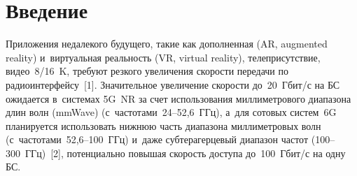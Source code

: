 
  
\vspace*{3pt}



\thispagestyle{headings}

\begin{multicols}{2}

\label{st\stat}
  
\section{Введение}

  Приложения недалекого будущего, такие как дополненная (AR, augmented reality) и~виртуальная 
реальность (VR, virtual reality), телеприсутствие, видео~8/16~K, требуют резкого 
увеличения ско\-рости передачи по радиоинтерфейсу~[1]. Значительное 
увеличение ско\-рости до~20~Гбит/с на БС ожидается 
в~сис\-те\-мах 5G~NR за счет использования мил\-ли\-мет\-ро\-во\-го 
диапазона длин волн (mmWave) (с~час\-то\-та\-ми~24--52,6~ГГц), а~для сотовых 
сис\-тем~6G планируется использовать ниж\-нюю часть диапазона 
мил\-ли\-мет\-ро\-вых волн (с~час\-то\-та\-ми~52,6--100~ГГц) и~даже субтерагерцевый 
диапазон час\-тот (100--300~ГГц)~[2], потенциально повышая ско\-рость доступа 
до~100~Гбит/с на одну БС.

\begin{figure*}[b] %
\vspace*{-6pt}
\begin{center}
   \mbox{%
\epsfxsize=106.848mm 
}

\end{center}
\vspace*{-9pt}
\end{figure*}
  

\end{multicols}
